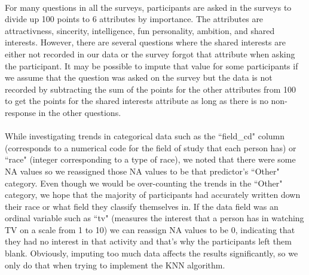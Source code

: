 \documentclass{article}
\begin{document}
\null\\
For many questions in all the surveys, participants are asked in the surveys to divide up 100 points to 6 attributes by importance.  The attributes are attractivness, sincerity, intelligence, fun personality, ambition, and shared interests.  However, there are several questions where the shared interests are either not recorded in our data or the survey forgot that attribute when asking the participant.  It may be possible to impute that value for some participants if we assume that the question was asked on the survey but the data is not recorded by subtracting the sum of the points for the other attributes from 100 to get the points for the shared interests attribute as long as there is no non-response in the other questions.\\
\null\\
While investigating trends in categorical data such as the ``field\_cd" column (corresponds to a numerical code for the field of study that each person has) or ``race" (integer corresponding to a type of race), we noted that there were some NA values so we reassigned those NA values to be that predictor's ``Other" category.  Even though we would be over-counting the trends in the ``Other" category, we hope that the majority of participants had accurately written down their race or what field they classify themselves in.  If the data field was an ordinal variable such as ``tv" (measures the interest that a person has in watching TV on a scale from 1 to 10) we can reassign NA values to be 0, indicating that they had no interest in that activity and that's why the participants left them blank.  Obviously, imputing too much data affects the results significantly, so we only do that when trying to implement the KNN algorithm.\\
\end{document}
